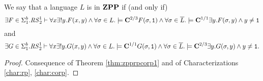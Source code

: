 \begin{characterization}
\label{char:zpp}
We say that a language $L$ is in $\mathbf{ZPP}$ if (and only if)
\[
\exists F \in \Sigma^b_1.{\mathit{RS}^1_2} \vdash \forall x \exists ! y. F(x, y)\land \forall \sigma \in L.\models \mathbf{C}^{2/3} F(\sigma, \mathtt{1}) \land \forall \sigma \in \overline L.\models \mathbf{C}^{1/1} \exists y. F(\sigma, y) \land y \neq \mathtt{1}
\]
and
\[
\exists G \in \Sigma^b_1.{\mathit{RS}^1_2} \vdash \forall x \exists ! y. G(x, y)\land \forall \sigma \in L.\models \mathbf{C}^{1/1} G(\sigma, \mathtt{1}) \land \forall \sigma \in \overline L.\models \mathbf{C}^{2/3} \exists y. G(\sigma, y) \land y \neq \mathtt{1}.
\]
\end{characterization}
\begin{proof}
Consequence of Theorem \ref{thm:zpprpcorp1} and of Characterizations \ref{char:rp}, \ref{char:corp}.
\end{proof}

